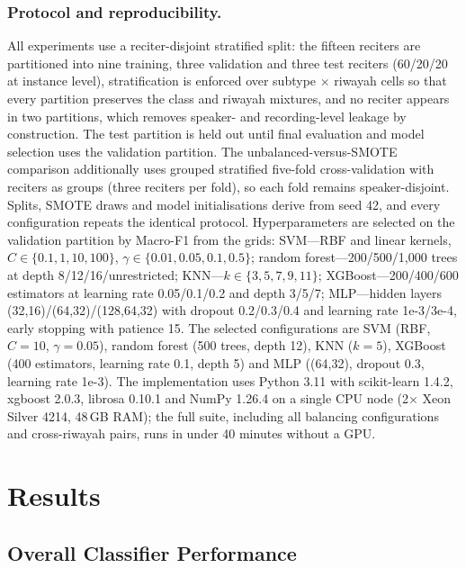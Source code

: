 \documentclass[runningheads]{llncs}
\begin{document}
\subsubsection{Protocol and reproducibility.}
All experiments use a reciter-disjoint stratified split: the fifteen reciters
are partitioned into nine training, three validation and three test reciters
(60/20/20 at instance level), stratification is enforced over subtype $\times$
riwayah cells so that every partition preserves the class and riwayah mixtures,
and no reciter appears in two partitions, which removes speaker- and
recording-level leakage by construction. The test partition is held out until
final evaluation and model selection uses the validation partition. The
unbalanced-versus-SMOTE comparison additionally uses grouped stratified
five-fold cross-validation with reciters as groups (three reciters per fold), so
each fold remains speaker-disjoint. Splits, SMOTE draws and model
initialisations derive from seed 42, and every configuration repeats the
identical protocol. Hyperparameters are selected on the validation partition by
Macro-F1 from the grids: SVM---RBF and linear kernels, $C \in \{0.1, 1, 10,
100\}$, $\gamma \in \{0.01, 0.05, 0.1, 0.5\}$; random forest---200/500/1{,}000
trees at depth 8/12/16/unrestricted; KNN---$k \in \{3,5,7,9,11\}$;
XGBoost---200/400/600 estimators at learning rate 0.05/0.1/0.2 and depth 3/5/7;
MLP---hidden layers (32,16)/(64,32)/(128,64,32) with dropout 0.2/0.3/0.4 and
learning rate 1e-3/3e-4, early stopping with patience 15. The selected
configurations are SVM (RBF, $C=10$, $\gamma=0.05$), random forest (500 trees,
depth 12), KNN ($k=5$), XGBoost (400 estimators, learning rate 0.1, depth 5) and
MLP ((64,32), dropout 0.3, learning rate 1e-3). The implementation uses Python
3.11 with scikit-learn 1.4.2, xgboost 2.0.3, librosa 0.10.1 and NumPy 1.26.4 on a
single CPU node (2$\times$ Xeon Silver 4214, 48\,GB RAM); the full suite,
including all balancing configurations and cross-riwayah pairs, runs in under
40 minutes without a GPU.


\section{Results}
\label{sec:results}

\subsection{Overall Classifier Performance}
\end{document}

